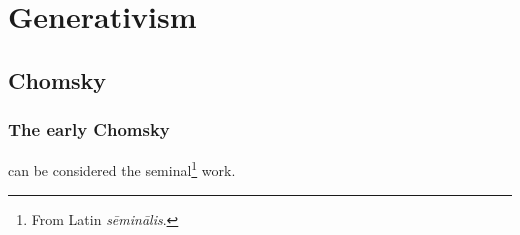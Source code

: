 \chapter{Generativism}
\section{Chomsky}
\subsection{The early Chomsky}
\citet{Chomsky1957} can be considered the seminal\footnote{
From Latin {\em sēminālis}.
} work.